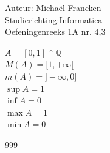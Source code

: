 \documentclass[a4paper]{article}
\begin{document}
\noindent \large Auteur: Michaël Francken\\
\noindent \large Studierichting:Informatica\\
\noindent \large Oefeningenreeks 1A nr. 4,3\\

\medskip

\normalsize

$A= [0,1]\cap \mathbb{Q}$\\

$M(A) = [1,+\infty[$\\

$m(A)= ]-\infty,0]$\\

$\sup A= 1$\\

$\inf A= 0$\\

$\max A= 1$\\

$\min A= 0$\\

\begin{thebibliography}{999}
\end{thebibliography}
\end{document}

